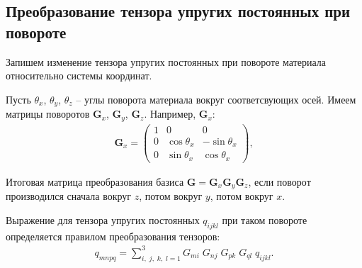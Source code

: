 \subsection{Преобразование тензора упругих постоянных при повороте}
Запишем изменение тензора упругих постоянных при повороте материала относительно системы координат.

Пусть $\theta_{x}$, $\theta_{y}$, $\theta_{z}$ -- углы поворота материала вокруг соответсвующих осей.
Имеем матрицы поворотов $\mathbf{G}_x$, $\mathbf{G}_y$, $\mathbf{G}_z$. Например, $\mathbf{G}_x$:
\begin{align}
\mathbf{G}_x =
\left( \begin{array}{cccccccccccc}
1 & 0 & 0 \\ 
0 & \cos \theta_{x} & -\sin \theta_{x} \\ 
0 & \sin \theta_{x} & \cos \theta_{x}
\end{array} \right),
\end{align}

Итоговая матрица преобразования базиса $\mathbf{G} = \mathbf{G}_{x}\mathbf{G}_{y}\mathbf{G}_{z}$, если поворот производился сначала вокруг $z$, потом вокруг $y$, потом вокруг $x$.

Выражение для тензора упругих постоянных $q_{ijkl}$ при таком повороте определяется правилом преобразования тензоров:
\begin{align}
	q_{mnpq} = \sum_{i,\;j,\;k,\;l = 1}^{3} G_{mi}\;G_{nj}\;G_{pk}\;G_{ql}\;q_{ijkl}.
\end{align}








